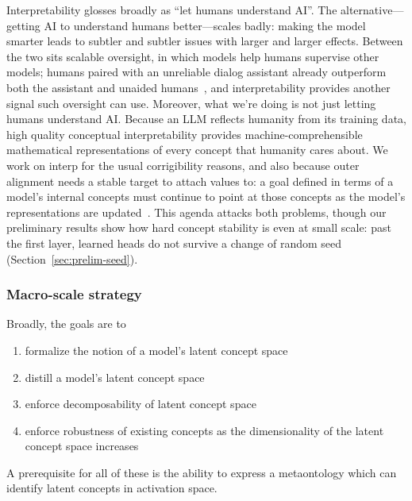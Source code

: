 Interpretability glosses broadly as ``let humans understand AI''. The
alternative---getting AI to understand humans better---scales badly:
making the model smarter leads to subtler and subtler issues with larger
and larger effects. Between the two sits scalable oversight, in which
models help humans supervise other models; humans paired with an
unreliable dialog assistant already outperform both the assistant and
unaided humans~\cite{bowman2022}, and interpretability provides another
signal such oversight can use. Moreover, what we're doing is not just
letting humans understand AI. Because an LLM reflects humanity from its
training data, high quality conceptual interpretability provides
machine-comprehensible mathematical representations of every concept
that humanity cares about. We work on interp for the usual
corrigibility reasons, and also because outer alignment needs a stable
target to attach values to: a goal defined in terms of a model's internal
concepts must continue to point at those concepts as the model's
representations are updated~\cite[Ch.~12]{bostrom2014}. This agenda
attacks both problems, though our preliminary results show how hard
concept stability is even at small scale: past the first layer, learned
heads do not survive a change of random seed
(Section~\ref{sec:prelim-seed}).

\subsubsection{Macro-scale strategy}
Broadly, the goals are to
\begin{enumerate}
  \item formalize the notion of a model's latent concept space
  \item distill a model's latent concept space
  \item enforce decomposability of latent concept space
  \item enforce robustness of existing concepts as the dimensionality of
  the latent concept space increases
\end{enumerate}
A prerequisite for all of these is the ability to express a
metaontology
which can identify latent concepts in activation space.


